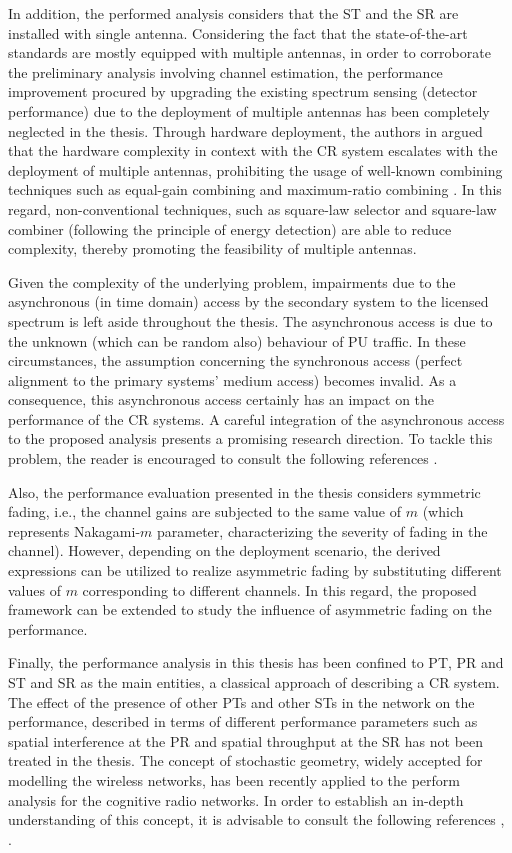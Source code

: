 In addition, the performed analysis considers that the ST and the SR are installed with single antenna. Considering the fact that the state-of-the-art standards are mostly equipped with multiple antennas, in order to corroborate the preliminary analysis involving channel estimation, the performance improvement procured by upgrading the existing spectrum sensing (detector performance) due to the deployment of multiple antennas \cite{Dig07,Tah10} has been completely neglected in the thesis. Through hardware deployment, the authors in  argued that the hardware complexity in context with the CR system escalates with the deployment of multiple antennas, prohibiting the usage of well-known combining techniques such as equal-gain combining and maximum-ratio combining \cite{Alouini03}. In this regard, non-conventional techniques, such as square-law selector and square-law combiner (following the principle of energy detection) are able to reduce complexity, thereby promoting the feasibility of multiple antennas. 

Given the complexity of the underlying problem, impairments due to the asynchronous (in time domain) access by the secondary system to the licensed spectrum is left aside throughout the thesis. The asynchronous access is due to the unknown (which can be random also) behaviour of PU traffic. In these circumstances, the assumption concerning the synchronous access (perfect alignment to the primary systems' medium access) becomes invalid. As a consequence, this asynchronous access certainly has an impact on the performance of the CR systems. A careful integration of the asynchronous access to the proposed analysis presents a promising research direction. To tackle this problem, the reader is encouraged to consult the following references \cite{Jiang13_, Jiang15}.

Also, the performance evaluation presented in the thesis considers symmetric fading, i.e., the channel gains are subjected to the same value of $m$ (which represents Nakagami-$m$ parameter, characterizing the severity of fading in the channel). However, depending on the deployment scenario, the derived expressions can be utilized to realize asymmetric fading \cite{Sura08} by substituting different values of $m$ corresponding to different channels. In this regard, the proposed framework can be extended to study the influence of asymmetric fading on the performance. 

Finally, the performance analysis in this thesis has been confined to PT, PR and ST and SR as the main entities, a classical approach of describing a CR system. The effect of the presence of other PTs and other STs in the network on the performance, described in terms of different performance parameters such as spatial interference at the PR and spatial throughput at the SR has not been treated in the thesis. The concept of stochastic geometry, widely accepted for modelling the wireless networks, has been recently applied to the perform analysis for the cognitive radio networks. In order to establish an in-depth understanding of this concept, it is advisable to consult the following references \cite{Ghasemi08, Lee12, Kusal12, Kusal13, Elsawy13, Song14}, . 


